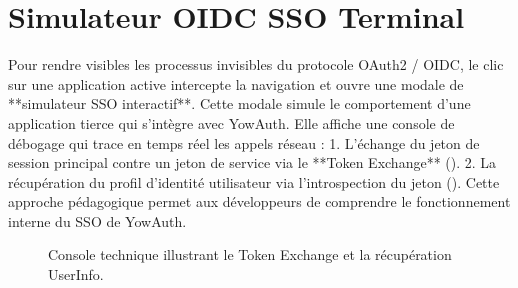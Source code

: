 \section{Simulateur OIDC SSO Terminal}
Pour rendre visibles les processus invisibles du protocole OAuth2 / OIDC, le clic sur une application active intercepte la navigation et ouvre une modale de **simulateur SSO interactif**.
Cette modale simule le comportement d'une application tierce qui s'intègre avec YowAuth. Elle affiche une console de débogage qui trace en temps réel les appels réseau :
1. L'échange du jeton de session principal contre un jeton de service via le **Token Exchange** ().
2. La récupération du profil d'identité utilisateur via l'introspection du jeton ().
Cette approche pédagogique permet aux développeurs de comprendre le fonctionnement interne du SSO de YowAuth.

\begin{figure}[h]
  \centering
  \caption{Console technique illustrant le Token Exchange et la récupération UserInfo.}
  \label{fig:poc-sso-modal}
\end{figure}
